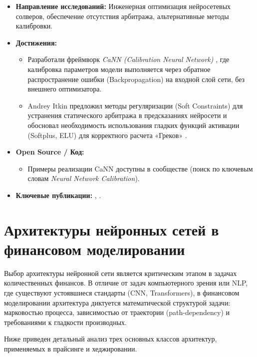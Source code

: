\documentclass[12pt, a4paper]{article}
\begin{document}
\begin{itemize}
    \item \textbf{Направление исследований:} Инженерная оптимизация нейросетевых солверов, обеспечение отсутствия арбитража, альтернативные методы калибровки.
    \item \textbf{Достижения:}
    \begin{itemize}
        \item Разработали фреймворк \textit{CaNN (Calibration Neural Network)} \cite{Liu2019}, где калибровка параметров модели выполняется через обратное распространение ошибки (Backpropagation) на входной слой сети, без внешнего оптимизатора.
        \item Andrey Itkin предложил методы регуляризации (Soft Constraints) для устранения статического арбитража в предсказаниях нейросети и обосновал необходимость использования гладких функций активации (Softplus, ELU) для корректного расчета «Греков» \cite{Itkin2019}.
    \end{itemize}
    \item \textbf{Open Source / Код:}
    \begin{itemize}
        \item Примеры реализации CaNN доступны в сообществе (поиск по ключевым словам \textit{Neural Network Calibration}).
    \end{itemize}
    \item \textbf{Ключевые публикации:} \cite{Liu2019}, \cite{Itkin2019}.
\end{itemize}

\section{Архитектуры нейронных сетей в финансовом моделировании}

Выбор архитектуры нейронной сети является критическим этапом в задачах количественных финансов. В отличие от задач компьютерного зрения или NLP, где существуют устоявшиеся стандарты (CNN, Transformers), в финансовом моделировании архитектура диктуется математической структурой задачи: марковостью процесса, зависимостью от траектории (path-dependency) и требованиями к гладкости производных.

Ниже приведен детальный анализ трех основных классов архитектур, применяемых в прайсинге и хеджировании.
\end{document}
